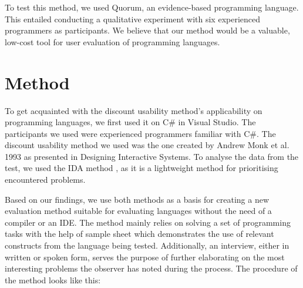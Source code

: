 \documentclass[preprint,10pt]{sigplanconf}
\begin{document}
To test this method, we used Quorum, an evidence-based programming language. This entailed conducting a qualitative experiment with six experienced programmers as participants.
We believe that our method would be a valuable, low-cost tool for user evaluation of programming languages. 


\section{Method}
To get acquainted with the discount usability method’s applicability on programming languages, we first used it on C\# in Visual Studio. The participants we used were experienced programmers familiar with C\#. The discount usability method we used was the one created by Andrew Monk et al. 1993 as presented in Designing Interactive Systems\cite{CooperativeEval}. To analyse the data from the test, we used the IDA method \cite{IDA}, as it is a lightweight method for prioritising encountered problems.

Based on our findings, we use both methods as a basis for creating a new evaluation method suitable for evaluating languages without the need of a compiler or an IDE. The method mainly relies on solving a set of programming tasks with the help of sample sheet which demonstrates the use of relevant constructs from the language being tested. Additionally, an interview, either in written or spoken form, serves the purpose of further elaborating on the most interesting problems the observer has noted during the process. The procedure of the method looks like this:
\end{document}
